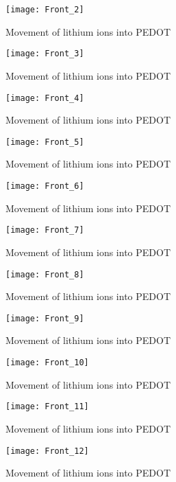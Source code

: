 \begin{figure}[!htp]
\centering
\texttt{[image: Front\_2]}
\caption{Movement of lithium ions into PEDOT} 
\label{Front_2}
\end{figure}

\begin{figure}[!htp]
\centering
\texttt{[image: Front\_3]}
\caption{Movement of lithium ions into PEDOT} 
\label{Front_3}
\end{figure}

\begin{figure}[!htp]
\centering
\texttt{[image: Front\_4]}
\caption{Movement of lithium ions into PEDOT} 
\label{Front_4}
\end{figure}

\begin{figure}[!htp]
\centering
\texttt{[image: Front\_5]}
\caption{Movement of lithium ions into PEDOT} 
\label{Front_5}
\end{figure}

\begin{figure}[!htp]
\centering
\texttt{[image: Front\_6]}
\caption{Movement of lithium ions into PEDOT} 
\label{Front_6}
\end{figure}

\begin{figure}[!htp]
\centering
\texttt{[image: Front\_7]}
\caption{Movement of lithium ions into PEDOT} 
\label{Front_7}
\end{figure}

\begin{figure}[!htp]
\centering
\texttt{[image: Front\_8]}
\caption{Movement of lithium ions into PEDOT} 
\label{Front_8}
\end{figure}

\begin{figure}[!htp]
\centering
\texttt{[image: Front\_9]}
\caption{Movement of lithium ions into PEDOT} 
\label{Front_9}
\end{figure}

\begin{figure}[!htp]
\centering
\texttt{[image: Front\_10]}
\caption{Movement of lithium ions into PEDOT} 
\label{Front_10}
\end{figure}

\begin{figure}[!htp]
\centering
\texttt{[image: Front\_11]}
\caption{Movement of lithium ions into PEDOT} 
\label{Front_11}
\end{figure}

\begin{figure}[!htp]
\centering
\texttt{[image: Front\_12]}
\caption{Movement of lithium ions into PEDOT} 
\label{Front_12}
\end{figure}